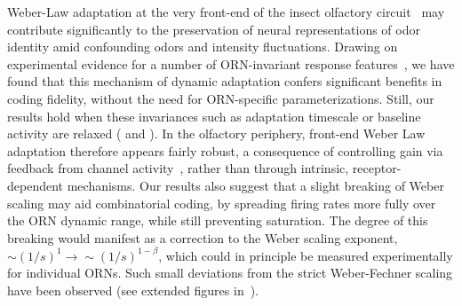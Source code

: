 \documentclass[9pt,lineno]{elife}
\begin{document}
Weber-Law adaptation at the very front-end of the insect olfactory circuit~\citep{srinivas_elife,cafaro_WL,cao_WL} may contribute significantly to the preservation of neural representations of odor identity amid confounding odors and intensity fluctuations. Drawing on experimental evidence for a number of ORN-invariant response features~\citep{nagel_wilson_biophysical,martelli,stevens,srinivas_elife,si2017invariances}, we have found that this mechanism of dynamic adaptation confers significant benefits in coding fidelity, without the need for ORN-specific parameterizations. Still, our results hold when these invariances such as adaptation timescale or baseline activity are relaxed ( and ). In the olfactory periphery, front-end Weber Law adaptation therefore appears fairly robust, a consequence of controlling gain via feedback from channel activity~\citep{EmonetReview,nagel_wilson_biophysical,srinivas_elife}, rather than through intrinsic, receptor-dependent mechanisms. {\color{blue} Our results also suggest that a slight breaking of Weber scaling may aid combinatorial coding, by spreading firing rates more fully over the ORN dynamic range, while still preventing saturation. The degree of this breaking would manifest as a correction to the Weber scaling exponent, $\sim(1/s)^1 \rightarrow \sim(1/s)^{1-\beta}$, which could in principle be measured experimentally for individual ORNs. Such small deviations from the strict Weber-Fechner scaling have been observed (see extended figures in~\citep{srinivas_elife}).
}
\end{document}
